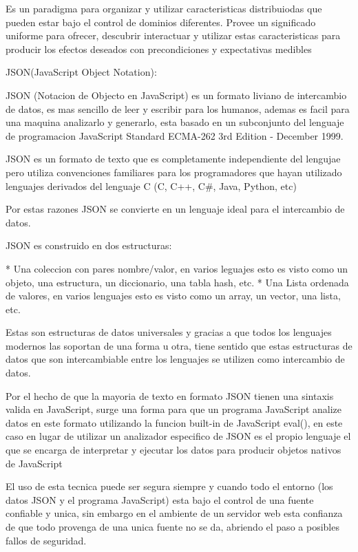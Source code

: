 Es un paradigma para organizar y utilizar caracteristicas distribuiodas que pueden estar bajo el control de dominios diferentes. Provee un significado uniforme para ofrecer, descubrir interactuar y utilizar estas caracteristicas para producir los efectos deseados con precondiciones y expectativas medibles 

JSON(JavaScript Object Notation):

JSON (Notacion de Objecto en JavaScript) es un formato liviano de intercambio de datos, es mas sencillo de leer y escribir para los humanos, ademas es facil para una maquina analizarlo y generarlo, esta basado en un subconjunto del lenguaje de programacion JavaScript Standard ECMA-262 3rd Edition - December 1999.

JSON es un formato de texto que es completamente independiente del lengujae pero utiliza convenciones familiares para los programadores que hayan utilizado lenguajes derivados del lenguaje C (C, C++, C\#, Java, Python, etc)

Por estas razones JSON se convierte en un lenguaje ideal para el intercambio de datos.

JSON es construido en dos estructuras:

* Una coleccion con pares nombre/valor, en varios leguajes esto es visto como un objeto, una estructura, un diccionario, una tabla hash, etc.
* Una Lista ordenada de valores, en varios lenguajes esto es visto como un array, un vector, una lista, etc.

Estas son estructuras de datos universales y gracias a que todos los lenguajes modernos las soportan de una forma u otra, tiene sentido que estas estructuras de datos que son intercambiable entre los lenguajes se utilizen como intercambio de datos.

Por el hecho de que la mayoria de texto en formato JSON tienen una sintaxis valida en JavaScript, surge una forma para que un programa JavaScript analize datos en este formato utilizando la funcion built-in de JavaScript eval(), en este caso en lugar de utilizar un analizador especifico de JSON es el propio lenguaje el que se encarga de interpretar y ejecutar los datos para producir objetos nativos de JavaScript 

El uso de esta tecnica puede ser segura siempre y cuando todo el entorno (los datos JSON y el programa JavaScript) esta bajo el control de una fuente confiable y unica, sin embargo en el ambiente de un servidor web esta confianza de que todo provenga de una unica fuente no se da, abriendo el paso a posibles fallos de seguridad.


